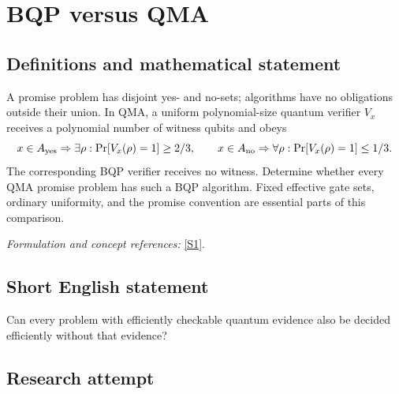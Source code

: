\documentclass[11pt,a4paper]{article}
\newcommand{\sref}[2]{\hyperlink{source:#1:#2}{[S#2]}}
\newif\ifshowcatalogue
\newcommand{\cataloguescope}[1]{\ifshowcatalogue
 \paragraph{Exact scope in the supplied catalogue.}
 \begin{quote}\small #1\end{quote}\fi}
\numberwithin{equation}{section}
\begin{document}
\setcounter{section}{0}
\clearpage
\section*{\texorpdfstring{BQP versus QMA}{BQP versus QMA}}\label{statement}
\subsection{Definitions and mathematical statement}
A promise problem has disjoint yes- and no-sets; algorithms have no obligations outside their union. In QMA, a uniform polynomial-size quantum verifier $V_x$ receives a polynomial number of witness qubits and obeys
\[
 x\in A_{\rm yes}\Rightarrow\exists\rho:\Pr[V_x(\rho)=1]\ge2/3,\qquad
 x\in A_{\rm no}\Rightarrow\forall\rho:\Pr[V_x(\rho)=1]\le1/3.
\]
The corresponding BQP verifier receives no witness. Determine whether every QMA promise problem has such a BQP algorithm. Fixed effective gate sets, ordinary uniformity, and the promise convention are essential parts of this comparison.
\par\smallskip\textit{Formulation and concept references:} \sref{statement}{1}.
\cataloguescope{For promise problems A=(A\_yes,A\_no) with disjoint sets of finite binary strings, use polynomial-time uniform quantum circuits over a fixed effectively specified finite universal gate set, with polynomially many gates and |0> ancillas and a measured output bit. BQP has such a circuit accepting each yes input with probability>=2/3 and each no input with probability<=1/3. QMA permits a polynomial-length quantum witness: each yes input has a witness accepted with probability>=2/3, and every witness on each no input is accepted with probability<=1/3. Outside the promise no condition is imposed. Is QMA contained in BQP, equivalently BQP=QMA?}
\subsection{Short English statement}
Can every problem with efficiently checkable quantum evidence also be decided efficiently without that evidence?
\subsection{Research attempt}
\end{document}
